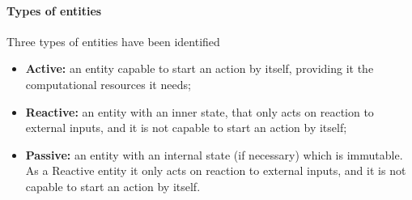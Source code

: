 \paragraph{Types of entities}

Three types of entities have been identified
\begin{itemize}
  \item \textbf{Active:} an entity capable to start an action by itself,
  providing it the computational resources it needs;
  \item \textbf{Reactive:} an entity with an inner state, that only acts on
reaction to external inputs, and it is not capable to start an action by itself;
  \item \textbf{Passive:} an entity with an internal state (if necessary) which
is immutable. As a Reactive entity it only acts on reaction to external inputs,
and it is not capable to start an action by itself.
\end{itemize}



